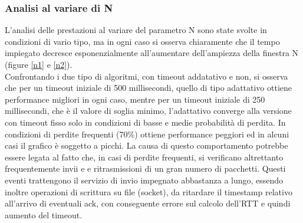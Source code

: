 \subsubsection{Analisi al variare di N}
L'analisi delle prestazioni al variare del parametro N sono state svolte in 
condizioni di vario tipo, ma in ogni caso si osserva chiaramente che il tempo
impiegato decresce esponenzialmente all'aumentare dell'ampiezza della finestra
N (figure \ref{n1} e \ref{n2}).\\
Confrontando i due tipo di algoritmi, con timeout addatativo e non, si osserva
che per un timeout iniziale di 500 millisecondi, quello di tipo adattativo 
ottiene performance migliori in ogni caso, mentre per un timeout iniziale di 
250 millisecondi, che è il valore di soglia minimo, l'adattativo converge 
alla versione con timeout fisso solo in condizioni di basse e medie probabilità di 
perdita. In condizioni di perdite frequenti (70\%) ottiene performance peggiori ed 
in alcuni casi il grafico è soggetto a picchi. La causa di questo comportamento 
potrebbe essere legata al fatto che, in casi di perdite frequenti, si verificano
altrettanto frequentemente invii e e ritrasmissioni di un gran numero di pacchetti.
Questi eventi trattengono il servizio di invio impegnato abbastanza a lungo,
essendo inoltre operazioni di scrittura su file (socket), da
ritardare il timestamp relativo all'arrivo di eventuali ack, con conseguente 
errore sul calcolo dell'RTT e quindi aumento del timeout.
